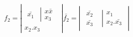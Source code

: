 \medskip

\hspace*{\fill}$f_{2}=\left|\begin{array}{c}
\begin{array}{cc}
\bar{x_{1}} & \left|\begin{array}{c}
x\bar{x}\\
x_{3}
\end{array}\right.\end{array}\\
x_{2}.x_{3}
\end{array}\right|$\hspace*{\fill}$\bar{f_{2}}=\left|\begin{array}{cc}
\begin{array}{c}
\bar{x_{2}}\\
\bar{x_{3}}
\end{array} & \left|\begin{array}{c}
x_{1}\\
x_{2}.\bar{x_{3}}
\end{array}\right.\end{array}\right|$\hspace*{\fill}

\ifdefined\COMPLETE
\else
    
\fi
